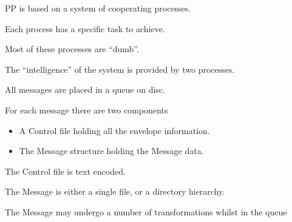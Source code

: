 \begin{bwslide}
\begin{nrtc}
\item	PP is based on a system of cooperating processes.

\item	Each process has a specific task to achieve.

\item	Most of these processes are ``dumb''.

\item	The ``intelligence'' of the system is provided by two processes.

\end{nrtc}
\end{bwslide}


\begin{bwslide}
\begin{nrtc}
\item	All messages are placed in a queue on disc.

\item	For each message there are two components
	\begin{itemize}
	\item	A Control file holding all the envelope information.
	\item	The Message structure holding the Message data.
	\end{itemize}
\item	The Control file is text encoded.

\item	The Message is either a single file, or a directory hierarchy.

\item	The Message may undergo a number of transformations whilst in
	the queue
\end{nrtc}
\end{bwslide}

